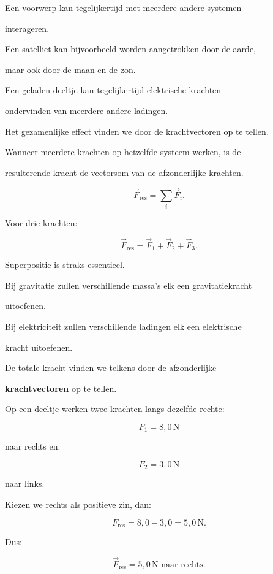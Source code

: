 \documentclass{ximera}
\begin{document}



Een voorwerp kan tegelijkertijd met meerdere andere systemen

interageren.

Een satelliet kan bijvoorbeeld worden aangetrokken door de aarde,

maar ook door de maan en de zon.

Een geladen deeltje kan tegelijkertijd elektrische krachten

ondervinden van meerdere andere ladingen.

Het gezamenlijke effect vinden we door de krachtvectoren op te tellen.


\begin{definitie}

Wanneer meerdere krachten op hetzelfde systeem werken, is de

resulterende kracht de vectorsom van de afzonderlijke krachten.

\[\boxed{ \vec F_{\mathrm{res}} = \sum_i\vec F_i. }\]

\end{definitie}


Voor drie krachten:

\[\boxed{ \vec F_{\mathrm{res}} = \vec F_1+\vec F_2+\vec F_3. }\]


\begin{opmerking}

Superpositie is straks essentieel.

Bij gravitatie zullen verschillende massa's elk een gravitatiekracht

uitoefenen.

Bij elektriciteit zullen verschillende ladingen elk een elektrische

kracht uitoefenen.

De totale kracht vinden we telkens door de afzonderlijke

\textbf{krachtvectoren} op te tellen.

\end{opmerking}


\begin{voorbeeld}

Op een deeltje werken twee krachten langs dezelfde rechte:

\[F_1=8{,}0\,\mathrm N\]

naar rechts en:

\[F_2=3{,}0\,\mathrm N\]

naar links.

Kiezen we rechts als positieve zin, dan:

\[F_{\mathrm{res}} = 8{,}0-3{,}0 = 5{,}0\,\mathrm N.\]

Dus:

\[\boxed{ \vec F_{\mathrm{res}} = 5{,}0\,\mathrm N \text{ naar rechts}. }\]

\end{voorbeeld}
\end{document}
